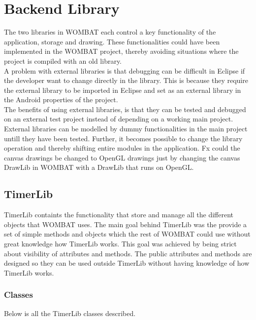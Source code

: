 \section{Backend Library}
\label{sec:backend}
The two libraries in WOMBAT each control a key functionality of the application, storage and drawing.
These functionalities could have been implemented in the WOMBAT project, thereby avoiding situations where the project is compiled with an old library.\\
A problem with external libraries is that debugging can be difficult in Eclipse if the developer want to change directly in the library. This is because they require the external library to be imported in Eclipse and set as an external library in the Android properties of the project.\\
The benefits of using external libraries, is that they can be tested and debugged on an external test project instead of depending on a working main project.
External libraries can be modelled by dummy functionalities in the main project untill they have been tested.
Further, it becomes possible to change the library operation and thereby shifting entire modules in the application.
Fx could the canvas drawings be changed to OpenGL drawings just by changing the canvas DrawLib in WOMBAT with a DrawLib that runs on OpenGL.


\subsection{TimerLib}
TimerLib containts the functionality that store and manage all the different objects that WOMBAT uses. The main goal behind TimerLib was the provide a set of simple methods and objects which the rest of WOMBAT could use without great knowledge how TimerLib works. This goal was achieved by being strict about visibility of attributes and methods. The public attributes and methods are designed so they can be used outside TimerLib without having knowledge of how TimerLib works.

\subsubsection{Classes}
Below is all the TimerLib classes described.


